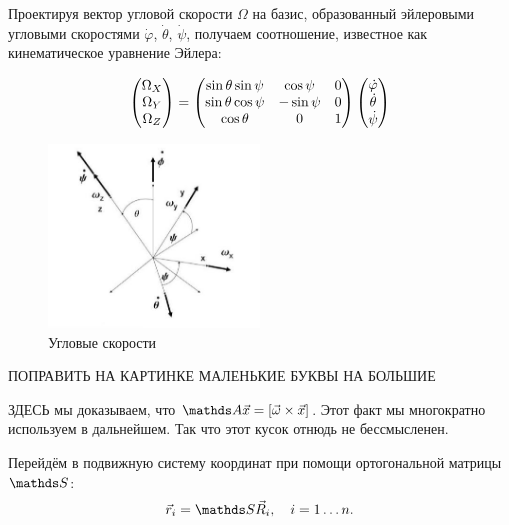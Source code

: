 Проектируя вектор угловой скорости $\Omega$ на базис, образованный эйлеровыми угловыми скоростями $\dot{\varphi}$, $\dot{\theta}$, $\dot{\psi}$, получаем соотношение, известное как кинематическое уравнение Эйлера:

\begin{gather}
\begin{pmatrix}
\Omega_X \\
\Omega_Y \\
\Omega_Z
\end{pmatrix} =
\begin{pmatrix}
\sin \theta \sin \psi & \cos \psi & 0 \\
\sin \theta \cos \psi & - \sin \psi & 0 \\
\cos \theta & 0 & 1
\end{pmatrix}
\begin{pmatrix}
\dot{\varphi} \\
\dot{\theta} \\
\dot{\psi}
\end{pmatrix} \notag
\end{gather}

\begin{figure}
  \centering
	\includegraphics[width=0.5\textwidth]{../pictures/AngularVelocities.jpg}
	\caption{Угловые скорости}
	\label{fig:AngularVelocities}
\end{figure}

ПОПРАВИТЬ НА КАРТИНКЕ МАЛЕНЬКИЕ БУКВЫ НА БОЛЬШИЕ

ЗДЕСЬ мы доказываем, что $\bbA \vec{x} = [ \vec{\omega} \times \vec{x} ]$. Этот факт мы многократно используем в дальнейшем. Так что этот кусок отнюдь не бессмысленен.

Перейдём в подвижную систему координат при помощи ортогональной матрицы $\bbS$:
\vverh
\begin{gather}
\vec{r}_i = \bbS \vec{R}_i, \quad i = 1 \dots n. \notag
\end{gather}

